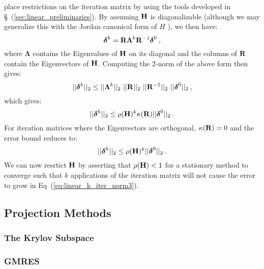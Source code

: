 place restrictions on the iteration matrix by using the tools
developed in \S~(\ref{sec:linear_preliminaries}). By assuming $\mathbf{H}$
is diagonalizable (although we may generalize this with the Jordan
canonical form of $H$ \citep{saad_2003}), we then have:
\begin{equation}
  \boldsymbol{\delta}^{k} =
  \mathbf{R}\boldsymbol{\Lambda}^k\mathbf{R}^{-1}\boldsymbol{\delta}^0\:,
  \label{eq:linear_k_iter_error_diag}
\end{equation}
where $\boldsymbol{\Lambda}$ contains the Eigenvalues of $\mathbf{H}$ on
its diagonal and the columns of $\mathbf{R}$ contain the Eigenvectors of
$\mathbf{H}$. Computing the 2-norm of the above form then gives:
\begin{equation}
  ||\boldsymbol{\delta}^{k}||_2 \leq ||\boldsymbol{\Lambda}^k||_2\ 
  ||\ve{R}||_2\ ||\ve{R}^{-1}||_2\ ||\boldsymbol{\delta}^0||_2\:,
  \label{eq:linear_k_iter_norm1}
\end{equation}
which gives:
\begin{equation}
  ||\boldsymbol{\delta}^{k}||_2 \leq \rho(\mathbf{H})^k \kappa(\mathbf{R})
  ||\boldsymbol{\delta}^0||_2\:.
  \label{eq:linear_k_iter_norm2}
\end{equation}
For iteration matrices where the Eigenvectors are orthogonal,
$\kappa(\mathbf{R})=0$ and the error bound reduces to:
\begin{equation}
  ||\boldsymbol{\delta}^{k}||_2 \leq \rho(\mathbf{H})^k
  ||\boldsymbol{\delta}^0||_2\:.
  \label{eq:linear_k_iter_norm3}
\end{equation}
We can now resrtict $\mathbf{H}$ by asserting that $\rho(\mathbf{H}) < 1$
for a stationary method to converge such that $k$ applications of the
iteration matrix will not cause the error to grow in
Eq~(\ref{eq:linear_k_iter_norm3}). 

\subsection{Projection Methods}
\label{subsec:projection_methods}

\subsubsection{The Krylov Subspace}
\label{subsubsec:krylov_subspace}

\subsubsection{GMRES}
\label{subsubsec:gmres}

